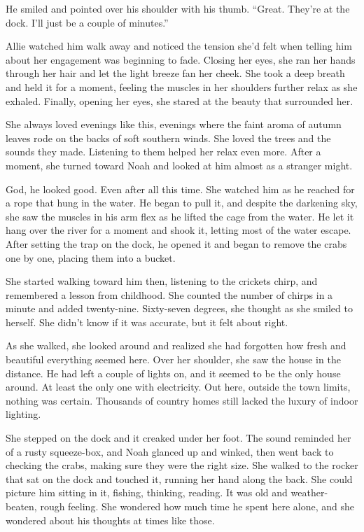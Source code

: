 \documentclass[10pt, twoside, openright]{book}
\begin{document}
He smiled and pointed over his shoulder with his thumb. ``Great. They're
at the dock. I'll just be a couple of minutes.''

Allie watched him walk away and noticed the tension she'd felt when
telling him about her engagement was beginning to fade. Closing her
eyes, she ran her hands through her hair and let the light breeze fan
her cheek. She took a deep breath and held it for a moment, feeling the
muscles in her shoulders further relax as she exhaled. Finally, opening
her eyes, she stared at the beauty that surrounded her.

She always loved evenings like this, evenings where the faint aroma of
autumn leaves rode on the backs of soft southern winds. She loved the
trees and the sounds they made. Listening to them helped her relax even
more. After a moment, she turned toward Noah and looked at him almost as
a stranger might.

God, he looked good. Even after all this time. She watched him as he
reached for a rope that hung in the water. He began to pull it, and
despite the darkening sky, she saw the muscles in his arm flex as he
lifted the cage from the water. He let it hang over the river for a
moment and shook it, letting most of the water escape. After setting the
trap on the dock, he opened it and began to remove the crabs one by one,
placing them into a bucket.

She started walking toward him then, listening to the crickets chirp,
and remembered a lesson from childhood. She counted the number of chirps
in a minute and added twenty-nine. Sixty-seven degrees, she thought as
she smiled to herself. She didn't know if it was accurate, but it felt
about right.

As she walked, she looked around and realized she had forgotten how
fresh and beautiful everything seemed here. Over her shoulder, she saw
the house in the distance. He had left a couple of lights on, and it
seemed to be the only house around. At least the only one with
electricity. Out here, outside the town limits, nothing was certain.
Thousands of country homes still lacked the luxury of indoor lighting.

She stepped on the dock and it creaked under her foot. The sound
reminded her of a rusty squeeze-box, and Noah glanced up and winked,
then went back to checking the crabs, making sure they were the right
size. She walked to the rocker that sat on the dock and touched it,
running her hand along the back. She could picture him sitting in it,
fishing, thinking, reading. It was old and weather-beaten, rough
feeling. She wondered how much time he spent here alone, and she
wondered about his thoughts at times like those.
\end{document}
